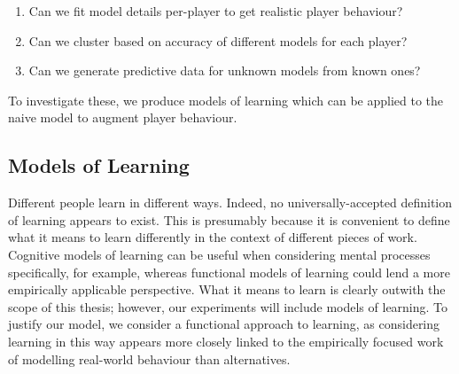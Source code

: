 \begin{enumerate}
  \item Can we fit model details per-player to get realistic player behaviour?
  \item Can we cluster based on accuracy of different models for each player?
  \item Can we generate predictive data for unknown models from known ones?
\end{enumerate}

To investigate these, we produce models of learning which can be applied to the
naive model to augment player behaviour.

\subsection{Models of Learning}
Different people learn in different ways. Indeed, no universally-accepted
definition of learning appears to exist. This is presumably because it is
convenient to define what it means to learn differently in the context of
different pieces of work. Cognitive models of learning can be useful when
considering mental processes specifically, for example, whereas functional
models of learning could lend a more empirically applicable perspective. What it
means to learn is clearly outwith the scope of this thesis; however, our
experiments will include models of learning. To justify our model, we consider a
functional approach to learning, as considering learning in this way appears
more closely linked to the empirically focused work of modelling real-world
behaviour than alternatives.


